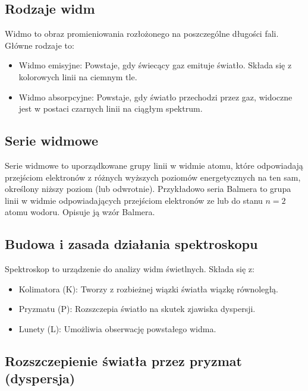 \documentclass[a4paper,12pt]{article}
\begin{document}
\subsection*{Rodzaje widm}

Widmo to obraz promieniowania rozłożonego na poszczególne długości fali. Główne rodzaje to:

\begin{itemize}
    \item Widmo emisyjne: Powstaje, gdy świecący gaz emituje światło. Składa się z kolorowych linii na ciemnym tle.
    \item Widmo absorpcyjne: Powstaje, gdy światło przechodzi przez gaz, widoczne jest w postaci czarnych linii na ciągłym spektrum.~\cite{fizyka_dla_szkół_wyższych_tom_3}
\end{itemize}

\subsection*{Serie widmowe}

Serie widmowe to uporządkowane grupy linii w widmie atomu, które odpowiadają przejściom elektronów z różnych wyższych poziomów energetycznych na ten sam, określony niższy poziom (lub odwrotnie). Przykładowo seria Balmera to grupa linii w widmie odpowiadających przejściom elektronów ze lub do stanu $n=2$ atomu wodoru. Opisuje ją wzór Balmera. ~\cite{fizyka_dla_szkół_wyższych_tom_3}

\subsection*{Budowa i zasada działania spektroskopu}

Spektroskop to urządzenie do analizy widm świetlnych. Składa się z:

\begin{itemize}
    \item Kolimatora (K): Tworzy z rozbieżnej wiązki światła wiązkę równoległą.
    \item Pryzmatu (P): Rozszczepia światło na skutek zjawiska dyspersji.
    \item Lunety (L): Umożliwia obserwację powstałego widma.
\end{itemize}

\subsection*{Rozszczepienie światła przez pryzmat (dyspersja)}
\end{document}
